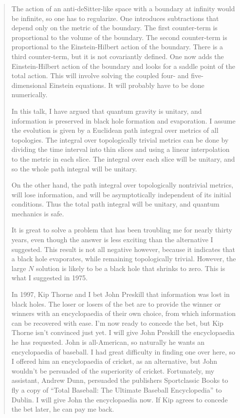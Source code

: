 \documentclass{article}
\begin{document}
\begin{quote}
The action of an anti-deSitter-like space with a boundary at infinity
would be infinite, so one has to regularize. One introduces subtractions
that depend only on the metric of the boundary. The first counter-term
is proportional to the volume of the boundary. The second counter-term
is proportional to the Einstein-Hilbert action of the boundary. There is
a third counter-term, but it is not covariantly defined. One now adds
the Einstein-Hilbert action of the boundary and looks for a saddle point
of the total action. This will involve solving the coupled four- and
five-dimensional Einstein equations. It will probably have to be done
numerically.

In this talk, I have argued that quantum gravity is unitary, and
information is preserved in black hole formation and evaporation. I
assume the evolution is given by a Euclidean path integral over metrics
of all topologies. The integral over topologically trivial metrics can
be done by dividing the time interval into thin slices and using a
linear interpolation to the metric in each slice. The integral over each
slice will be unitary, and so the whole path integral will be unitary.

On the other hand, the path integral over topologically nontrivial
metrics, will lose information, and will be asymptotically independent
of its initial conditions. Thus the total path integral will be unitary,
and quantum mechanics is safe.

It is great to solve a problem that has been troubling me for nearly
thirty years, even though the answer is less exciting than the
alternative I suggested. This result is not all negative however,
because it indicates that a black hole evaporates, while remaining
topologically trivial. However, the large \(N\) solution is likely to be
a black hole that shrinks to zero. This is what I suggested in 1975.

In 1997, Kip Thorne and I bet John Preskill that information was lost in
black holes. The loser or losers of the bet are to provide the winner or
winners with an encyclopaedia of their own choice, from which
information can be recovered with ease. I'm now ready to concede the
bet, but Kip Thorne isn't convinced just yet. I will give John Preskill
the encyclopaedia he has requested. John is all-American, so naturally
he wants an encyclopaedia of baseball. I had great difficulty in finding
one over here, so I offered him an encyclopaedia of cricket, as an
alternative, but John wouldn't be persuaded of the superiority of
cricket. Fortunately, my assistant, Andrew Dunn, persuaded the
publishers Sportclassic Books to fly a copy of ``Total Baseball: The
Ultimate Baseball Encyclopedia'' to Dublin. I will give John the
encyclopaedia now. If Kip agrees to concede the bet later, he can pay me
back.
\end{quote}
\end{document}
